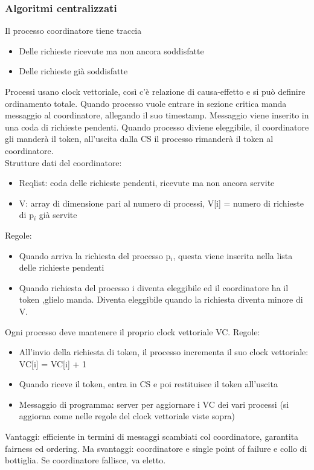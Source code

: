 \documentclass[16px]{article}
\begin{document}
\subsubsection{Algoritmi centralizzati}
Il processo coordinatore tiene traccia
\begin{itemize}
\item Delle richieste ricevute ma non ancora soddisfatte
\item Delle richieste già soddisfatte
\end{itemize}
Processi usano clock vettoriale, così c'è relazione di causa-effetto e si può definire ordinamento totale. Quando processo vuole entrare in sezione critica manda messaggio al coordinatore, allegando il suo timestamp. Messaggio viene inserito in una coda di richieste pendenti. Quando processo diviene eleggibile, il coordinatore gli manderà il token, all'uscita dalla CS il processo rimanderà il token al coordinatore.\\ Strutture dati del coordinatore:
\begin{itemize}
\item Reqlist: coda delle richieste pendenti, ricevute ma non ancora servite
\item V: array di dimensione pari al numero di processi, V[i] = numero di richieste di p$_i$ già servite 
\end{itemize}
Regole:
\begin{itemize}
\item Quando arriva la richiesta del processo p$_i$, questa viene inserita nella lista delle richieste pendenti
\item Quando richiesta del processo i diventa eleggibile ed il coordinatore ha il token ,glielo manda. Diventa eleggibile quando la richiesta diventa minore di V.
\end{itemize}
Ogni processo deve mantenere il proprio clock vettoriale VC. Regole:
\begin{itemize}
\item All'invio della richiesta di token, il processo incrementa il suo clock vettoriale: VC[i] = VC[i] + 1
\item Quando riceve il token, entra in CS e poi restituisce il token all'uscita
\item Messaggio di programma: server per aggiornare i VC dei vari processi (si aggiorna come nelle regole del clock vettoriale viste sopra)
\end{itemize}
Vantaggi: efficiente in termini di messaggi scambiati col coordinatore, garantita fairness ed ordering. Ma svantaggi: coordinatore e single point of failure e collo di bottiglia. Se coordinatore fallisce, va eletto.
\end{document}
